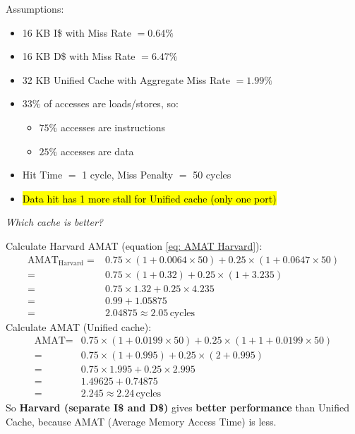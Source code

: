 \begin{examplebox}
    Assumptions:
    \begin{itemize}
        \item 16 KB I\$ with Miss Rate $= 0.64\%$
        \item 16 KB D\$ with Miss Rate $= 6.47\%$
        \item 32 KB Unified Cache with Aggregate Miss Rate $= 1.99\%$
        \item $33\%$ of accesses are loads/stores, so:
        \begin{itemize}
            \item $75\%$ accesses are instructions
            \item $25\%$ accesses are data
        \end{itemize}
        \item Hit Time $=$ 1 cycle, Miss Penalty $=$ 50 cycles
        \item \hl{Data hit has 1 more stall for Unified cache (only one port)}
    \end{itemize}
    \emph{Which cache is better?}

    Calculate Harvard AMAT (equation \ref{eq: AMAT Harvard}):
    \begin{equation*}
        \begin{array}{rl}
            \text{AMAT}_{\text{Harvard}} =& 0.75 \times (1 + 0.0064 \times 50) + 0.25 \times (1 + 0.0647 \times 50) \\ [.5em]
            =& 0.75 \times (1 + 0.32) + 0.25 \times (1 + 3.235) \\ [.5em]
            =& 0.75 \times 1.32 + 0.25 \times 4.235 \\ [.5em]
            =& 0.99 + 1.05875 \\ [.5em]
            =& 2.04875 \approx 2.05 \, \text{cycles}
        \end{array}
    \end{equation*}
    Calculate AMAT (Unified cache):
    \begin{equation*}
        \begin{array}{rl}
            \text{AMAT} =& 0.75 \times (1 + 0.0199 \times 50) + 0.25 \times (1 + 1 + 0.0199 \times 50) \\ [.5em]
            =& 0.75 \times (1 + 0.995) + 0.25 \times (2 + 0.995) \\ [.5em]
            =& 0.75 \times 1.995 + 0.25 \times 2.995 \\ [.5em]
            =& 1.49625 + 0.74875 \\ [.5em]
            =& 2.245 \approx 2.24 \, \text{cycles}
        \end{array}
    \end{equation*}
    So \textbf{Harvard (separate I\$ and D\$)} gives \textbf{better performance} than Unified Cache, because AMAT (Average Memory Access Time) is less.
\end{examplebox}

